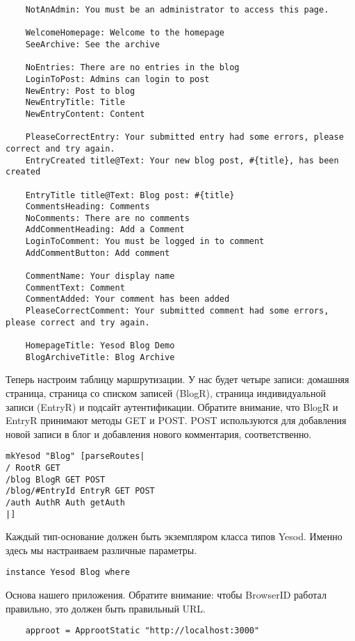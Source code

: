 \begin{lstlisting}
    NotAnAdmin: You must be an administrator to access this page.

    WelcomeHomepage: Welcome to the homepage
    SeeArchive: See the archive

    NoEntries: There are no entries in the blog
    LoginToPost: Admins can login to post
    NewEntry: Post to blog
    NewEntryTitle: Title
    NewEntryContent: Content

    PleaseCorrectEntry: Your submitted entry had some errors, please correct and try again.
    EntryCreated title@Text: Your new blog post, #{title}, has been created

    EntryTitle title@Text: Blog post: #{title}
    CommentsHeading: Comments
    NoComments: There are no comments
    AddCommentHeading: Add a Comment
    LoginToComment: You must be logged in to comment
    AddCommentButton: Add comment

    CommentName: Your display name
    CommentText: Comment
    CommentAdded: Your comment has been added
    PleaseCorrectComment: Your submitted comment had some errors, please correct and try again.

    HomepageTitle: Yesod Blog Demo
    BlogArchiveTitle: Blog Archive
\end{lstlisting}

Теперь настроим таблицу маршрутизации. У нас будет четыре записи: домашняя страница, страница со списком записей (BlogR), страница индивидуальной записи (EntryR) и подсайт аутентификации. Обратите внимание, что BlogR и EntryR принимают методы GET и POST. POST используются для добавления новой записи в блог и добавления нового комментария, соответственно.
 
\begin{lstlisting}
mkYesod "Blog" [parseRoutes|
/ RootR GET
/blog BlogR GET POST
/blog/#EntryId EntryR GET POST
/auth AuthR Auth getAuth
|]
\end{lstlisting}
 
Каждый тип-основание должен быть экземпляром класса типов Yesod. Именно здесь мы настраиваем различные параметры.
 
\begin{lstlisting}
instance Yesod Blog where
\end{lstlisting}
 
Основа нашего приложения. Обратите внимание: чтобы BrowserID работал правильно, это должен быть правильный URL.
 
\begin{lstlisting}
    approot = ApprootStatic "http://localhost:3000"
\end{lstlisting}
 
